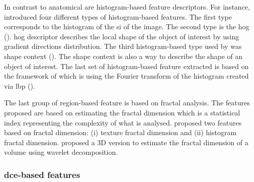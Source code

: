 \begin{enumerate}[leftmargin=*]
In contrast to anatomical are histogram-based feature descriptors. For instance, \cite{Liu2013} introduced four different types of histogram-based features. The first type corresponds to the histogram of the \ac{si} of the image. The second type is the \acf{hog} (\cite{Dalal2005}). \Ac{hog} descriptor describes the local shape of the object of interest by using gradient directions distribution. %
The third histogram-based type used by \cite{Liu2013} was shape context (\cite{Belongie2002}). The shape context is also a way to describe the shape of an object of interest. %
The last set of histogram-based feature extracted is based on the framework of \cite{Zhao2012} which is using the Fourier transform of the histogram created via \acf{lbp} (\cite{Ojala1996}).%

The last group of region-based feature is based on fractal analysis. The features proposed are based on estimating the fractal dimension which is a statistical index representing the complexity of what is analysed. \cite{Lv2009} proposed two features based on fractal dimension: (i) texture fractal dimension and (ii) histogram fractal dimension. %
\cite{Lopes2011} proposed a 3D version to estimate the fractal dimension of a volume using wavelet decomposition.
\end{enumerate}

\subsubsection{\ac{dce}-based features}\label{subsubsec:fddce}


